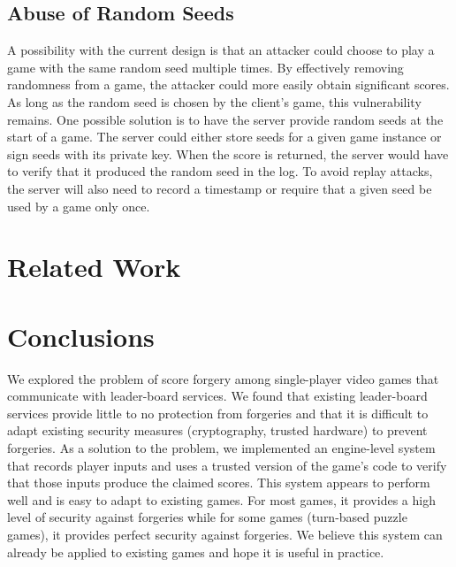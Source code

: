 \documentclass [11pt, twocolumn] {article}
\begin{document}
\subsection {Abuse of Random Seeds}

A possibility with the current design is that an attacker could choose to play a game with the same random seed multiple times. By effectively removing randomness from a game, the attacker could more easily obtain significant scores. As long as the random seed is chosen by the client's game, this vulnerability remains. One possible solution is to have the server provide random seeds at the start of a game. The server could either store seeds for a given game instance or sign seeds with its private key. When the score is returned, the server would have to verify that it produced the random seed in the log. To avoid replay attacks, the server will also need to record a timestamp or require that a given seed be used by a game only once. 

\section { Related Work } 


\section { Conclusions } 
\label{sec:conclusions}

We explored the problem of score forgery among single-player video games that communicate with leader-board services. We found that existing leader-board services provide little to no protection from forgeries and that it is difficult to adapt existing security measures (cryptography, trusted hardware) to prevent forgeries. As a solution to the problem, we implemented an engine-level system that records player inputs and uses a trusted version of the game's code to verify that those inputs produce the claimed scores. This system appears to perform well and is easy to adapt to existing games. For most games, it provides a high level of security against forgeries while for some games (turn-based puzzle games), it provides perfect security against forgeries. We believe this system can already be applied to existing games and hope it is useful in practice. 
\end{document}
